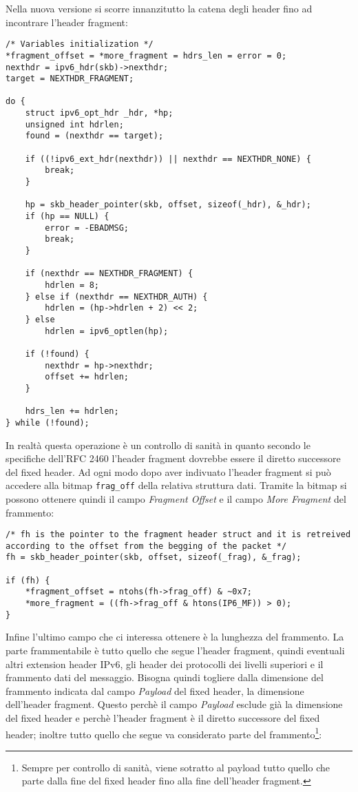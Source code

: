 \documentclass[a4paper,10pt]{article}
\begin{document}
Nella nuova versione si scorre innanzitutto la catena degli header fino
ad incontrare l'header fragment:
\begin{lstlisting}
/* Variables initialization */
*fragment_offset = *more_fragment = hdrs_len = error = 0;
nexthdr = ipv6_hdr(skb)->nexthdr;
target = NEXTHDR_FRAGMENT;

do {
	struct ipv6_opt_hdr _hdr, *hp;
	unsigned int hdrlen;
	found = (nexthdr == target);

	if ((!ipv6_ext_hdr(nexthdr)) || nexthdr == NEXTHDR_NONE) {
		break;
	}

	hp = skb_header_pointer(skb, offset, sizeof(_hdr), &_hdr);
	if (hp == NULL) {
		error = -EBADMSG;
		break;
	}

	if (nexthdr == NEXTHDR_FRAGMENT) {
		hdrlen = 8;
	} else if (nexthdr == NEXTHDR_AUTH) {
		hdrlen = (hp->hdrlen + 2) << 2;
	} else
		hdrlen = ipv6_optlen(hp);

	if (!found) {
		nexthdr = hp->nexthdr;
		offset += hdrlen;
	}

	hdrs_len += hdrlen;
} while (!found);
\end{lstlisting}

In realtà questa operazione è un
controllo di sanità in quanto secondo le specifiche dell'RFC 2460\cite{rfc2460}
l'header fragment
dovrebbe essere il diretto successore del fixed header. 
Ad ogni modo dopo aver indivuato l'header fragment si può accedere alla
bitmap \texttt{frag\_off} della relativa struttura dati. Tramite la
bitmap si possono ottenere quindi il campo \emph{Fragment Offset} e il
campo \emph{More
Fragment} del frammento:

\begin{lstlisting}
/* fh is the pointer to the fragment header struct and it is retreived
according to the offset from the begging of the packet */
fh = skb_header_pointer(skb, offset, sizeof(_frag), &_frag);

if (fh) {
	*fragment_offset = ntohs(fh->frag_off) & ~0x7;
	*more_fragment = ((fh->frag_off & htons(IP6_MF)) > 0);
} 
\end{lstlisting}
 
Infine l'ultimo campo che ci interessa ottenere è la lunghezza del
frammento. La parte frammentabile è tutto quello che segue l'header
fragment, quindi eventuali altri extension header IPv6, gli header dei
protocolli dei livelli superiori e il frammento dati del messaggio.
Bisogna quindi togliere dalla dimensione del frammento indicata dal
campo \emph{Payload} del fixed header, la dimensione dell'header fragment.
Questo perchè il campo \emph{Payload} esclude già la dimensione del fixed
header e perchè l'header fragment è il diretto successore del fixed
header; inoltre tutto quello che segue va considerato parte del
frammento\footnote{Sempre per controllo di sanità, viene sotratto al
payload
tutto quello che parte dalla fine del fixed header fino alla fine
dell'header fragment.}:
\end{document}
